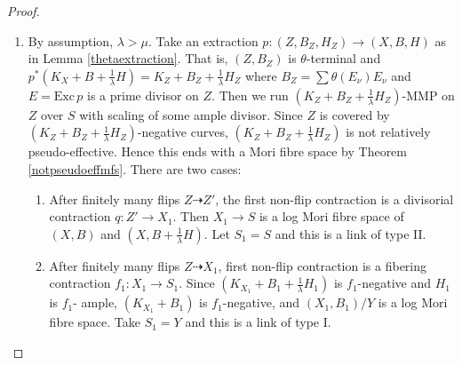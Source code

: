 \documentclass[11pt]{amsart}
\numberwithin{equation}{section}
\begin{document}
\begin{proof}
\begin{enumerate}
\begin{enumerate}
  \end{enumerate}
\item\label{b}By assumption, $\lambda>\mu$. Take  an extraction $ p:(Z,B_Z,H_Z)\to (X,B,H) $ as in Lemma \ref{thetaextraction}. That is,  $ (Z,B_Z) $ is $ \theta $-terminal and $ p^*(K_X+B+\frac{1}{\lambda}H)=K_Z+B_Z+\frac{1}{\lambda}H_Z $ where $ B_Z=\sum\theta(E_\nu)E_\nu $ and $ E=\mathrm{Exc}\,p $ is a prime divisor on $ Z $.
  Then we run $ (K_Z+B_Z+\frac{1}{\lambda}H_Z) $-MMP on $ Z $ over $ S $ with scaling of some ample divisor. Since $Z$ is covered by $ (K_Z+B_Z+\frac{1}{\lambda}H_Z) $-negative curves, $ (K_Z+B_Z+\frac{1}{\lambda}H_Z) $ is not relatively pseudo-effective. Hence this  ends with a Mori fibre space by Theorem \ref{notpseudoeffmfs}. There are two cases:
  \begin{enumerate}
    \item \label{b1}After finitely many flips $ Z\dashrightarrow Z' $, the first non-flip contraction is a divisorial contraction $ q:Z'\to X_1 $. Then $ X_{1}\to S $ is a log Mori fibre space of $(X,B)$ and $(X,B+\frac{1}{\lambda}H)$.  Let $ S_1=S $ and this is a link of type II.
    \item\label{b2}After finitely many flips $ Z\dashrightarrow X_1 $, first non-flip contraction is a fibering contraction $ f_1:X_1\to S_{1}$. Since $ (K_{X_1}+B_1+\frac{1}{\lambda}H_1) $ is $ f_1 $-negative and $ H_1 $ is $ f_1 $- ample, $ (K_{X_1}+B_1) $ is $ f_1 $-negative, and $ (X_1,B_1)/Y $ is a log Mori fibre space.  Take $ S_1=Y $ and this is a link of type I.
  \end{enumerate} 
\end{enumerate}
\end{proof}
\end{document}
